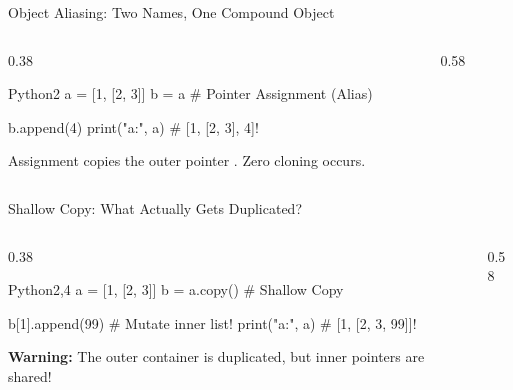 \begin{frame}[fragile]{Object Aliasing: Two Names, One Compound Object}
  \begin{columns}[T,onlytextwidth]
    \begin{column}{0.38\textwidth}
      \begin{HighlightedCodeBlock}{Python}{2}
a = [1, [2, 3]]
b = a  # Pointer Assignment (Alias)

b.append(4)
print("a:", a) # [1, [2, 3], 4]!
      \end{HighlightedCodeBlock}
      \vspace{0.08cm}
      {\scriptsize\color{UpGradSlate}Assignment copies the outer pointer . Zero cloning occurs.}
    \end{column}
    \begin{column}{0.58\textwidth}
      \centering
    \end{column}
  \end{columns}
  \vspace{0.15cm}
\end{frame}

\begin{frame}[fragile]{Shallow Copy: What Actually Gets Duplicated?}
  \begin{columns}[T,onlytextwidth]
    \begin{column}{0.38\textwidth}
      \begin{HighlightedCodeBlock}{Python}{2,4}
a = [1, [2, 3]]
b = a.copy()  # Shallow Copy

b[1].append(99) # Mutate inner list!
print("a:", a)  # [1, [2, 3, 99]]!
      \end{HighlightedCodeBlock}
      \vspace{0.08cm}
      {\scriptsize\color{AWSOrange}\textbf{Warning:} The outer container is duplicated, but inner pointers are shared!}
    \end{column}
    \begin{column}{0.58\textwidth}
      \centering
    \end{column}
  \end{columns}
  \vspace{0.15cm}
\end{frame}

